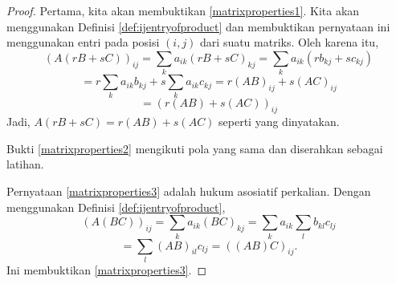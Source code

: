 \ifdefined\showproofs
\begin{proof}
 Pertama, kita akan membuktikan \ref{matrixproperties1}. Kita akan menggunakan Definisi \ref{def:ijentryofproduct}
dan membuktikan pernyataan ini menggunakan entri pada posisi $(i,j)$ dari suatu matriks.
Oleh karena itu,
\begin{equation*}
\left( A\left( rB+sC\right) \right) _{ij}=\sum_{k}a_{ik}\left( rB+sC\right)
_{kj}=\sum_{k}a_{ik}\left( rb_{kj}+sc_{kj}\right)
\end{equation*}
\begin{equation*}
=r\sum_{k}a_{ik}b_{kj}+s\sum_{k}a_{ik}c_{kj}=r\left( AB\right) _{ij}+s\left(
AC\right) _{ij}
\end{equation*}
\begin{equation*}
=\left( r\left( AB\right) +s\left( AC\right) \right) _{ij}
\end{equation*}
Jadi, $A\left( rB+sC\right) =r(AB)+s(AC)$ seperti yang dinyatakan. 

Bukti \ref{matrixproperties2} mengikuti pola yang sama dan diserahkan sebagai latihan. 

Pernyataan \ref{matrixproperties3} adalah hukum asosiatif perkalian. Dengan menggunakan
Definisi \ref{def:ijentryofproduct},
\begin{equation*}
\left( A\left( BC\right) \right) _{ij}=\sum_{k}a_{ik}\left( BC\right)
_{kj}=\sum_{k}a_{ik}\sum_{l}b_{kl}c_{lj}
\end{equation*}
\begin{equation*}
=\sum_{l}\left( AB\right) _{il}c_{lj}=\left( \left( AB\right) C\right) _{ij}.
\end{equation*}
Ini membuktikan \ref{matrixproperties3}.
\end{proof}
\fi
